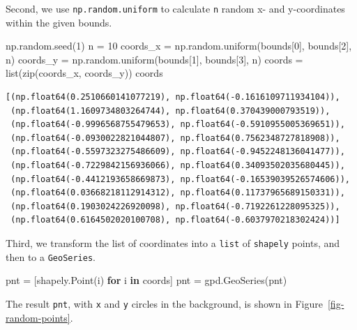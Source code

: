 \documentclass[
  letterpaper,
]{krantz}
\newenvironment{Shaded}{\begin{snugshade}}{\end{snugshade}}
\newcommand{\BuiltInTok}[1]{\textcolor[rgb]{0.00,0.23,0.31}{#1}}
\newcommand{\ControlFlowTok}[1]{\textcolor[rgb]{0.00,0.23,0.31}{\textbf{#1}}}
\newcommand{\DecValTok}[1]{\textcolor[rgb]{0.68,0.00,0.00}{#1}}
\newcommand{\KeywordTok}[1]{\textcolor[rgb]{0.00,0.23,0.31}{\textbf{#1}}}
\newcommand{\NormalTok}[1]{\textcolor[rgb]{0.00,0.23,0.31}{#1}}
\newcommand{\OperatorTok}[1]{\textcolor[rgb]{0.37,0.37,0.37}{#1}}
\begin{document}
Second, we use \texttt{np.random.uniform} to calculate \texttt{n} random
x- and y-coordinates within the given bounds.

\begin{Shaded}
\begin{Highlighting}[]
\NormalTok{np.random.seed(}\DecValTok{1}\NormalTok{)}
\NormalTok{n }\OperatorTok{=} \DecValTok{10}
\NormalTok{coords\_x }\OperatorTok{=}\NormalTok{ np.random.uniform(bounds[}\DecValTok{0}\NormalTok{], bounds[}\DecValTok{2}\NormalTok{], n)}
\NormalTok{coords\_y }\OperatorTok{=}\NormalTok{ np.random.uniform(bounds[}\DecValTok{1}\NormalTok{], bounds[}\DecValTok{3}\NormalTok{], n)}
\NormalTok{coords }\OperatorTok{=} \BuiltInTok{list}\NormalTok{(}\BuiltInTok{zip}\NormalTok{(coords\_x, coords\_y))}
\NormalTok{coords}
\end{Highlighting}
\end{Shaded}

\begin{verbatim}
[(np.float64(0.2510660141077219), np.float64(-0.1616109711934104)),
 (np.float64(1.1609734803264744), np.float64(0.370439000793519)),
 (np.float64(-0.9996568755479653), np.float64(-0.5910955005369651)),
 (np.float64(-0.0930022821044807), np.float64(0.7562348727818908)),
 (np.float64(-0.5597323275486609), np.float64(-0.9452248136041477)),
 (np.float64(-0.7229842156936066), np.float64(0.34093502035680445)),
 (np.float64(-0.4412193658669873), np.float64(-0.16539039526574606)),
 (np.float64(0.03668218112914312), np.float64(0.11737965689150331)),
 (np.float64(0.1903024226920098), np.float64(-0.7192261228095325)),
 (np.float64(0.6164502020100708), np.float64(-0.6037970218302424))]
\end{verbatim}

Third, we transform the list of coordinates into a \texttt{list} of
\texttt{shapely} points, and then to a \texttt{GeoSeries}.

\begin{Shaded}
\begin{Highlighting}[]
\NormalTok{pnt }\OperatorTok{=}\NormalTok{ [shapely.Point(i) }\ControlFlowTok{for}\NormalTok{ i }\KeywordTok{in}\NormalTok{ coords]}
\NormalTok{pnt }\OperatorTok{=}\NormalTok{ gpd.GeoSeries(pnt)}
\end{Highlighting}
\end{Shaded}

The result \texttt{pnt}, with \texttt{x} and \texttt{y} circles in the
background, is shown in Figure~\ref{fig-random-points}.
\end{document}
